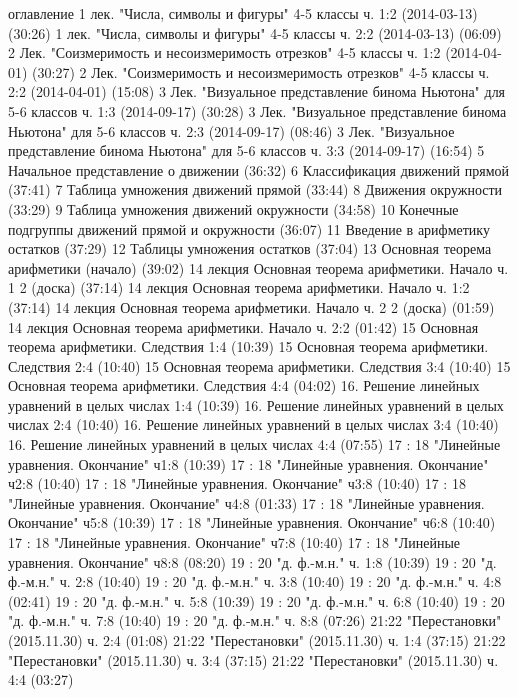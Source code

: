 оглавление
1 лек. "Числа, символы и фигуры" 4-5 классы ч. 1:2 (2014-03-13) (30:26)
1 лек. "Числа, символы и фигуры" 4-5 классы ч. 2:2 (2014-03-13) (06:09)
2 Лек. "Соизмеримость и несоизмеримость отрезков" 4-5 классы ч. 1:2 (2014-04-01) (30:27)
2 Лек. "Соизмеримость и несоизмеримость отрезков" 4-5 классы ч. 2:2 (2014-04-01) (15:08)
3 Лек. "Визуальное представление бинома Ньютона" для 5-6 классов ч. 1:3 (2014-09-17) (30:28)
3 Лек. "Визуальное представление бинома Ньютона" для 5-6 классов ч. 2:3 (2014-09-17) (08:46)
3 Лек. "Визуальное представление бинома Ньютона" для 5-6 классов ч. 3:3 (2014-09-17) (16:54)
5 Начальное представление о движении (36:32)
6 Классификация движений прямой (37:41)
7 Таблица умножения движений прямой (33:44)
8 Движения окружности (33:29)
9 Таблица умножения движений окружности (34:58)
10 Конечные подгруппы движений прямой и окружности (36:07)
11 Введение в арифметику остатков (37:29)
12 Таблицы умножения остатков (37:04)
13 Основная теорема арифметики (начало) (39:02)
14 лекция Основная теорема арифметики. Начало ч. 1 2 (доска) (37:14)
14 лекция Основная теорема арифметики. Начало ч. 1:2 (37:14)
14 лекция Основная теорема арифметики. Начало ч. 2 2 (доска) (01:59)
14 лекция Основная теорема арифметики. Начало ч. 2:2 (01:42)
15 Основная теорема арифметики. Следствия 1:4 (10:39)
15 Основная теорема арифметики. Следствия 2:4 (10:40)
15 Основная теорема арифметики. Следствия 3:4 (10:40)
15 Основная теорема арифметики. Следствия 4:4 (04:02)
16. Решение линейных уравнений в целых числах 1:4 (10:39)
16. Решение линейных уравнений в целых числах 2:4 (10:40)
16. Решение линейных уравнений в целых числах 3:4 (10:40)
16. Решение линейных уравнений в целых числах 4:4 (07:55)
17 : 18 "Линейные уравнения. Окончание" ч1:8 (10:39)
17 : 18 "Линейные уравнения. Окончание" ч2:8 (10:40)
17 : 18 "Линейные уравнения. Окончание" ч3:8 (10:40)
17 : 18 "Линейные уравнения. Окончание" ч4:8 (01:33)
17 : 18 "Линейные уравнения. Окончание" ч5:8 (10:39)
17 : 18 "Линейные уравнения. Окончание" ч6:8 (10:40)
17 : 18 "Линейные уравнения. Окончание" ч7:8 (10:40)
17 : 18 "Линейные уравнения. Окончание" ч8:8 (08:20)
19 : 20 "д. ф.-м.н." ч. 1:8 (10:39)
19 : 20 "д. ф.-м.н." ч. 2:8 (10:40)
19 : 20 "д. ф.-м.н." ч. 3:8 (10:40)
19 : 20 "д. ф.-м.н." ч. 4:8 (02:41)
19 : 20 "д. ф.-м.н." ч. 5:8 (10:39)
19 : 20 "д. ф.-м.н." ч. 6:8 (10:40)
19 : 20 "д. ф.-м.н." ч. 7:8 (10:40)
19 : 20 "д. ф.-м.н." ч. 8:8 (07:26)
21:22 "Перестановки" (2015.11.30) ч. 2:4 (01:08)
21:22 "Перестановки" (2015.11.30) ч. 1:4 (37:15)
21:22 "Перестановки" (2015.11.30) ч. 3:4 (37:15)
21:22 "Перестановки" (2015.11.30) ч. 4:4 (03:27)
